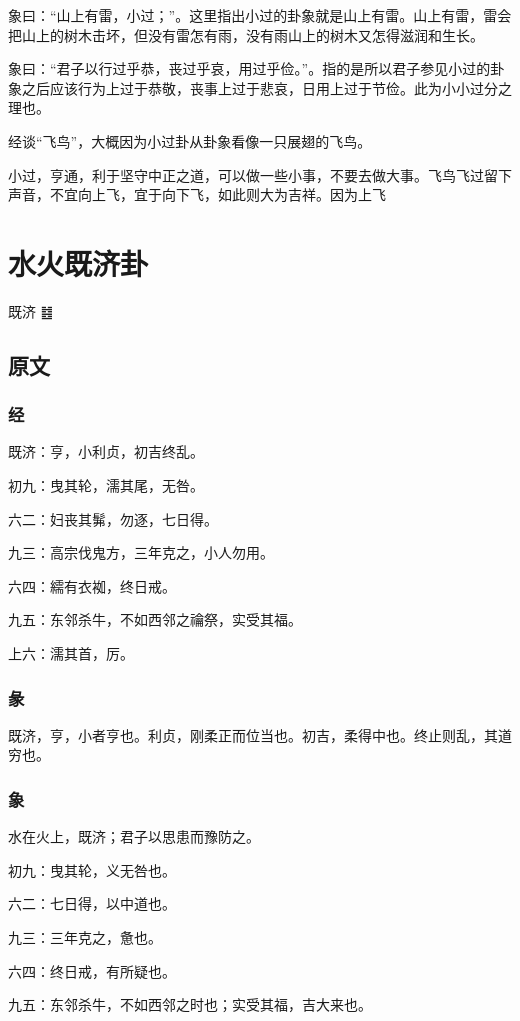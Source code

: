\documentclass[12pt,oneside]{book}
\begin{document}
象曰：“山上有雷，小过；”。这里指出小过的卦象就是山上有雷。山上有雷，雷会把山上的树木击坏，但没有雷怎有雨，没有雨山上的树木又怎得滋润和生长。

象曰：“君子以行过乎恭，丧过乎哀，用过乎俭。”。指的是所以君子参见小过的卦象之后应该行为上过于恭敬，丧事上过于悲哀，日用上过于节俭。此为小小过分之理也。

经谈“飞鸟”，大概因为小过卦从卦象看像一只展翅的飞鸟。

小过，亨通，利于坚守中正之道，可以做一些小事，不要去做大事。飞鸟飞过留下声音，不宜向上飞，宜于向下飞，如此则大为吉祥。因为上飞




\chapter{水火既济卦}
既济 {\Large ䷾}
\section{原文}

\subsection{经}
既济：亨，小利贞，初吉终乱。

初九：曳其轮，濡其尾，无咎。

六二：妇丧其髴，勿逐，七日得。

九三：高宗伐鬼方，三年克之，小人勿用。

六四：繻有衣袽，终日戒。

九五：东邻杀牛，不如西邻之禴祭，实受其福。

上六：濡其首，厉。

\subsection{彖}
既济，亨，小者亨也。利贞，刚柔正而位当也。初吉，柔得中也。终止则乱，其道穷也。

\subsection{象}
水在火上，既济；君子以思患而豫防之。

初九：曳其轮，义无咎也。

六二：七日得，以中道也。

九三：三年克之，惫也。

六四：终日戒，有所疑也。

九五：东邻杀牛，不如西邻之时也；实受其福，吉大来也。
\end{document}
